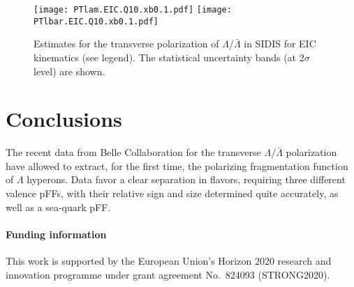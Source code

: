 \documentclass[submission, Proceedings]{SciPost}
\begin{document}
\begin{figure}[!thb]
\centering
\texttt{[image: PTlam.EIC.Q10.xb0.1.pdf]}
\texttt{[image: PTlbar.EIC.Q10.xb0.1.pdf]}
\caption{Estimates for the transverse polarization of $\Lambda$/$\bar\Lambda$ in SIDIS for EIC kinematics (see legend). The statistical uncertainty bands (at 2$\sigma$ level) are shown.}
\label{fig:sidis}
\end{figure}


\section{Conclusions}
\label{concl}

The recent data from Belle Collaboration for the transverse $\Lambda/\bar\Lambda$ polarization have allowed to extract, for the first time,  the polarizing fragmentation function of $\Lambda$ hyperons. Data favor a clear separation in flavors, requiring three different valence pFFs, with their relative sign and size determined quite accurately, as well as a sea-quark pFF.



\paragraph{Funding information}
This work is supported by the European Union's Horizon 2020 research and innovation programme under grant agreement No.~824093 (STRONG2020).






\nolinenumbers
\end{document}
